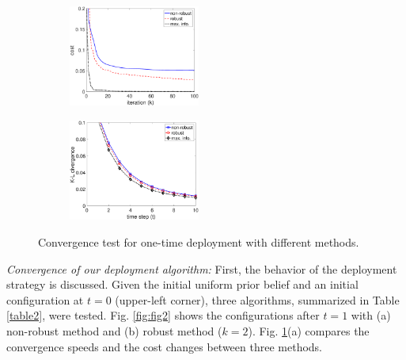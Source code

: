 \documentclass[letterpaper, 10 pt, conference]{ieeeconf}
\begin{document}
\begin{figure}
	\centering
	\begin{subfigure}[b]{0.23\textwidth}
		\centering
	\includegraphics[width=1.7in]{figure/cost_left}
	\caption{}
	\end{subfigure}
	\begin{subfigure}[b]{0.23\textwidth}
		\centering
	\includegraphics[width=1.7in]{figure/kl_right}
	\caption{}
	\end{subfigure}
	\caption{Convergence test for one-time deployment with different methods.}
	\label{fig:fig0}
\end{figure}




\textit{Convergence of our deployment algorithm:}
First, the behavior of the deployment strategy is discussed. Given the initial uniform prior belief and an initial configuration at $t=0$ (upper-left corner), three algorithms, summarized in Table \ref{table2}, were tested.
Fig. \ref{fig:fig2} shows the configurations after $t=1$ with (a) non-robust method  and (b) robust method ($k=2$). 
Fig. \ref{fig:fig0}(a) compares the convergence speeds and the cost changes between three methods.
\end{document}
